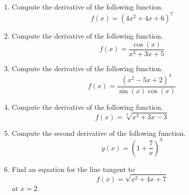\documentclass{article}
\begin{document}
\ActivityTitle[class=Calculus I, number=4, name=Differentiation II]

\begin{enumerate}
\item Compute the derivative of the following function. \[ f(x) = (4 x^2 + 4 x + 6)^{7} \]

  
\vspace{5cm}

\item Compute the derivative of the following function. \[ f(x) = \frac{\cos(x)}{x^3 + 3 x + 5} \]

  
\vspace{5cm}

\item Compute the derivative of the following function. \[ f(x) = \frac{(x^2 - 5 x + 2)^{4}}{\sin(x)\cos(x)} \]

  
\vspace{5cm}

\item Compute the derivative of the following function. \[ f(x) = \sqrt[4]{x^3 + 3 x - 3} \]

  
\vspace{5cm}

\item Compute the second derivative of the following function. \[ y(x) = \left( 1 + \frac{7}{x} \right)^{3} \]

  
\vspace{5cm}

\item Find an equation for the line tangent to \[ f(x) = \sqrt{x^2 + 4 x + 7} \] at $x = 2$.

  
\vspace{5cm}
\end{enumerate}
\end{document}
